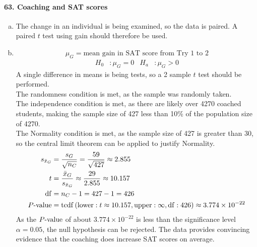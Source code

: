 \documentclass[../Homework]{subfiles}
\begin{document}
		\paragraph{63. Coaching and SAT scores}
			\begin{enumerate}[a.]
				\item
					The change in an individual is being examined, so the data is paired. A paired $t$ test using gain should therefore be used.
				\item
					\[\mu_G = \text{mean gain in SAT score from Try 1 to 2}\]
					\begin{align*}
						H_0&: \mu_G = 0 & H_a&: \mu_G > 0
					\end{align*}
					A single difference in means is being tests, so a 2 sample $t$ test should be performed. \\
					The randomness condition is met, as the sample was randomly taken. \\
					The independence condition is met, as there are likely over 4270 coached students, making the sample size of 427 less than 10\% of the population size of 4270. \\
					The Normality condition is met, as the sample size of 427 is greater than 30, so the central limit theorem can be applied to justify Normality.
					\begin{align*}
						s_{\bar{x}_G} &= \frac{s_G}{\sqrt{n_C}} = \frac{59}{\sqrt{427}} \approx 2.855 \\
						t &= \frac{\bar{x}_G}{s_{\bar{x}_G}} \approx \frac{29}{2.855} \approx 10.157 \\
						\operatorname{df} &= n_C - 1 = 427 - 1 = 426 \\
						P\text{-value} &= \operatorname{tcdf}\left(\operatorname{lower}: t \approx 10.157, \operatorname{upper}: \infty, \operatorname{df}: 426\right) \approx 3.774 \times 10^{-22}
					\end{align*}
					As the $P\text{-value}$ of about $3.774 \times 10^{-22}$ is less than the significance level $\alpha = 0.05$, the null hypothesis can be rejected. The data provides convincing evidence that the coaching does increase SAT scores on average.
			\end{enumerate}
\end{document}
